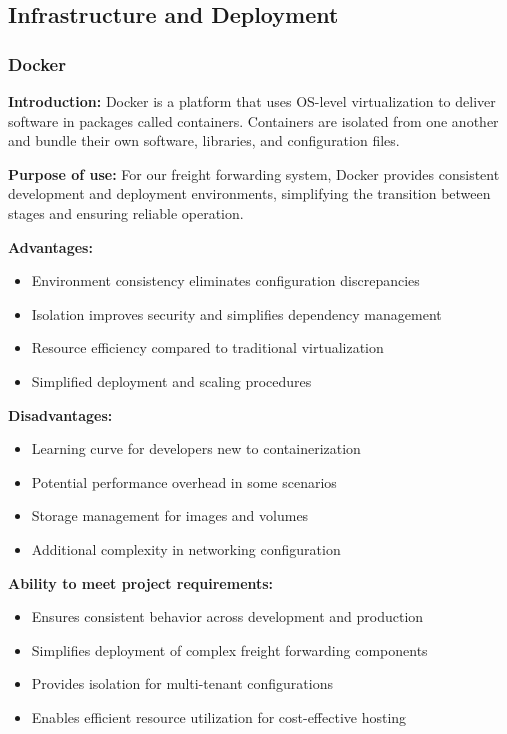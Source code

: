 \subsection{Infrastructure and Deployment}
\subsubsection{Docker}
\textbf{Introduction:} Docker \cite{docker} is a platform that uses OS-level virtualization to deliver software in packages called containers. Containers are isolated from one another and bundle their own software, libraries, and configuration files.

\textbf{Purpose of use:} For our freight forwarding system, Docker provides consistent development and deployment environments, simplifying the transition between stages and ensuring reliable operation.

\textbf{Advantages:}
\begin{itemize}
    \item Environment consistency eliminates configuration discrepancies
    \item Isolation improves security and simplifies dependency management
    \item Resource efficiency compared to traditional virtualization
    \item Simplified deployment and scaling procedures
\end{itemize}

\textbf{Disadvantages:}
\begin{itemize}
    \item Learning curve for developers new to containerization
    \item Potential performance overhead in some scenarios
    \item Storage management for images and volumes
    \item Additional complexity in networking configuration
\end{itemize}

\textbf{Ability to meet project requirements:}
\begin{itemize}
    \item Ensures consistent behavior across development and production
    \item Simplifies deployment of complex freight forwarding components
    \item Provides isolation for multi-tenant configurations
    \item Enables efficient resource utilization for cost-effective hosting
\end{itemize}

